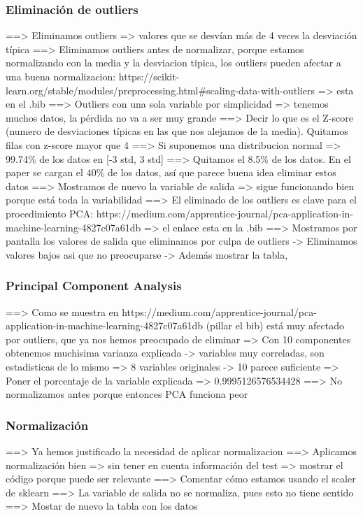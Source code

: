 \documentclass[11pt]{article}
\begin{document}
\subsubsection{Eliminación de outliers}

==> Eliminamos outliers => valores que se desvían más de 4 veces la desviación típica
==> Eliminamos outliers antes de normalizar, porque estamos normalizando con la media y la desviacion tipica, los outliers pueden afectar a una buena normalizacion: https://scikit-learn.org/stable/modules/preprocessing.html\#scaling-data-with-outliers => esta en el .bib
==> Outliers con una sola variable por simplicidad => tenemos muchos datos, la pérdida no va a ser muy grande
==> Decir lo que es el Z-score (numero de desviaciones típicas en las que nos alejamos de la media). Quitamos filas con z-score mayor que 4
==> Si suponemos una distribucion normal => 99.74\% de los datos en [-3 std, 3 std]
==> Quitamos el 8.5\% de los datos. En el paper se cargan el 40\% de los datos, así que parece buena idea eliminar estos datos
==> Mostramos de nuevo la variable de salida => sigue funcionando bien porque está toda la variabilidad
==> El eliminado de los outliers es clave para el procedimiento PCA: https://medium.com/apprentice-journal/pca-application-in-machine-learning-4827c07a61db => el enlace esta en la .bib
==> Mostramos por pantalla los valores de salida que eliminamos por culpa de outliers -> Eliminamos valores bajos asi que no preocuparse -> Además mostrar la tabla,

\subsubsection{Principal Component Analysis}

==> Como se muestra en https://medium.com/apprentice-journal/pca-application-in-machine-learning-4827c07a61db (pillar el bib) está muy afectado por outliers, que ya nos hemos preocupado de eliminar
=> Con 10 componentes obtenemos muchisima varianza explicada -> variables muy correladas, son estadisticas de lo mismo
=> 8 variables originales -> 10 parece suficiente
=> Poner el porcentaje de la variable explicada
        => 0.9995126576534428
==> No normalizamos antes porque entonces PCA funciona peor

\subsubsection{Normalización}

==> Ya hemos justificado la necesidad de aplicar normalizacion
==> Aplicamos normalización bien => sin tener en cuenta información del test => mostrar el código porque puede ser relevante
==> Comentar cómo estamos usando el scaler de sklearn
==> La variable de salida no se normaliza, pues esto no tiene sentido
==> Mostar de nuevo la tabla con los datos
\end{document}
